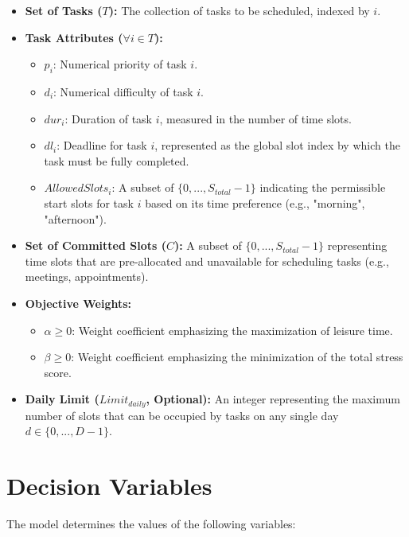 \documentclass{article}
\begin{document}
\begin{itemize}
    \item \textbf{Set of Tasks ($T$):} The collection of tasks to be scheduled, indexed by $i$.
    \item \textbf{Task Attributes ($\forall i \in T$):}
    \begin{itemize}
        \item $p_i$: Numerical priority of task $i$.
        \item $d_i$: Numerical difficulty of task $i$.
        \item $dur_i$: Duration of task $i$, measured in the number of time slots.
        \item $dl_i$: Deadline for task $i$, represented as the global slot index by which the task must be fully completed.
        \item $AllowedSlots_i$: A subset of $\{0, ..., S_{total}-1\}$ indicating the permissible start slots for task $i$ based on its time preference (e.g., "morning", "afternoon").
    \end{itemize}
    \item \textbf{Set of Committed Slots ($C$):} A subset of $\{0, ..., S_{total}-1\}$ representing time slots that are pre-allocated and unavailable for scheduling tasks (e.g., meetings, appointments).
    \item \textbf{Objective Weights:}
    \begin{itemize}
        \item $\alpha \ge 0$: Weight coefficient emphasizing the maximization of leisure time.
        \item $\beta \ge 0$: Weight coefficient emphasizing the minimization of the total stress score.
    \end{itemize}
    \item \textbf{Daily Limit ($Limit_{daily}$, Optional):} An integer representing the maximum number of slots that can be occupied by tasks on any single day $d \in \{0, ..., D-1\}$.
\end{itemize}

\section{Decision Variables}

The model determines the values of the following variables:
\end{document}
